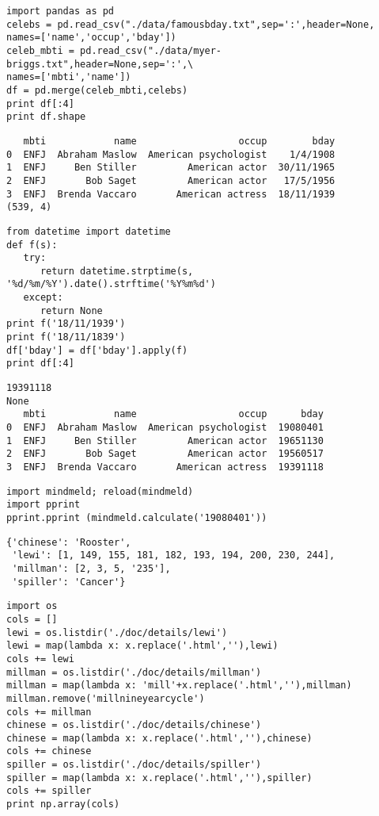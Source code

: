 \documentclass[12pt,fleqn]{article}\usepackage{common}
\begin{document}
\begin{verbatim}
import pandas as pd
celebs = pd.read_csv("./data/famousbday.txt",sep=':',header=None, 
names=['name','occup','bday'])
celeb_mbti = pd.read_csv("./data/myer-briggs.txt",header=None,sep=':',\
names=['mbti','name'])
df = pd.merge(celeb_mbti,celebs)
print df[:4]
print df.shape
\end{verbatim}

\begin{verbatim}
   mbti            name                  occup        bday
0  ENFJ  Abraham Maslow  American psychologist    1/4/1908
1  ENFJ     Ben Stiller         American actor  30/11/1965
2  ENFJ       Bob Saget         American actor   17/5/1956
3  ENFJ  Brenda Vaccaro       American actress  18/11/1939
(539, 4)
\end{verbatim}

\begin{verbatim}
from datetime import datetime
def f(s):
   try:
      return datetime.strptime(s, '%d/%m/%Y').date().strftime('%Y%m%d')
   except: 
      return None
print f('18/11/1939')
print f('18/11/1839')
df['bday'] = df['bday'].apply(f)
print df[:4]
\end{verbatim}

\begin{verbatim}
19391118
None
   mbti            name                  occup      bday
0  ENFJ  Abraham Maslow  American psychologist  19080401
1  ENFJ     Ben Stiller         American actor  19651130
2  ENFJ       Bob Saget         American actor  19560517
3  ENFJ  Brenda Vaccaro       American actress  19391118
\end{verbatim}

\begin{verbatim}
import mindmeld; reload(mindmeld)
import pprint
pprint.pprint (mindmeld.calculate('19080401'))
\end{verbatim}

\begin{verbatim}
{'chinese': 'Rooster',
 'lewi': [1, 149, 155, 181, 182, 193, 194, 200, 230, 244],
 'millman': [2, 3, 5, '235'],
 'spiller': 'Cancer'}
\end{verbatim}

\begin{verbatim}
import os
cols = []
lewi = os.listdir('./doc/details/lewi')
lewi = map(lambda x: x.replace('.html',''),lewi)
cols += lewi
millman = os.listdir('./doc/details/millman')
millman = map(lambda x: 'mill'+x.replace('.html',''),millman)
millman.remove('millnineyearcycle')
cols += millman
chinese = os.listdir('./doc/details/chinese')
chinese = map(lambda x: x.replace('.html',''),chinese)
cols += chinese
spiller = os.listdir('./doc/details/spiller')
spiller = map(lambda x: x.replace('.html',''),spiller)
cols += spiller
print np.array(cols)
\end{verbatim}
\end{document}
